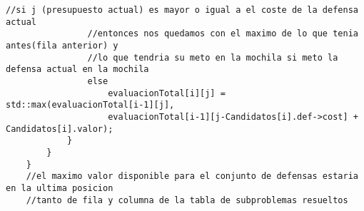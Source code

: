 \begin{lstlisting}[frame=single,basicstyle=\tiny,title={Algoritmo para rellenar la tabla de subproblemas resueltos}]
                //si j (presupuesto actual) es mayor o igual a el coste de la defensa actual
                //entonces nos quedamos con el maximo de lo que tenia antes(fila anterior) y 
                //lo que tendria su meto en la mochila si meto la defensa actual en la mochila
                else
                    evaluacionTotal[i][j] = std::max(evaluacionTotal[i-1][j],
                    evaluacionTotal[i-1][j-Candidatos[i].def->cost] + Candidatos[i].valor);
            }
        }
    }
    //el maximo valor disponible para el conjunto de defensas estaria en la ultima posicion
    //tanto de fila y columna de la tabla de subproblemas resueltos 
\end{lstlisting}
